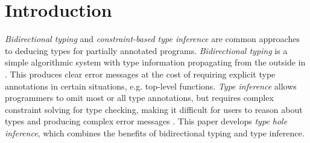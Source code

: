 



\section{Introduction}
\label{sec:intro}
\emph{Bidirectional typing} and \emph{constraint-based type inference} are common approaches to deducing types for partially annotated programs. \emph{Bidirectional typing} is a simple algorithmic system with type information propagating from the outside in \cite{BidirTyping}. This produces clear error messages at the cost of requiring explicit type annotations in certain situations, e.g. top-level functions. \emph{Type inference} allows programmers to omit most or all type annotations, but requires complex constraint solving for type checking, making it difficult for users to reason about types and producing complex error messages \cite{typeinferDif}.
This paper develops \emph{type hole inference}, which combines the benefits of bidirectional typing and type inference.\par

